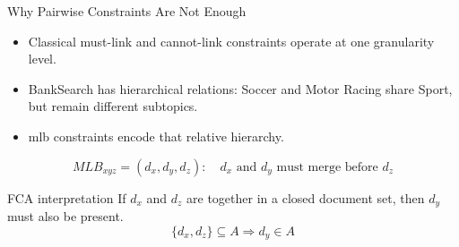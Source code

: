 \begin{frame}{Why Pairwise Constraints Are Not Enough}
\begin{itemize}
    \item Classical must-link and cannot-link constraints operate at one granularity level.
    \item BankSearch has hierarchical relations: Soccer and Motor Racing share Sport, but remain different subtopics.
    \item \ac{mlb} constraints encode that relative hierarchy.
\end{itemize}

\vspace{0.5em}
\[
MLB_{xyz} = (d_x,d_y,d_z):
\quad
d_x \text{ and } d_y \text{ must merge before } d_z
\]

\begin{block}{FCA interpretation}
If $d_x$ and $d_z$ are together in a closed document set, then $d_y$ must also be present.
\[
\{d_x,d_z\}\subseteq A \Rightarrow d_y\in A
\]
\end{block}
\end{frame}
